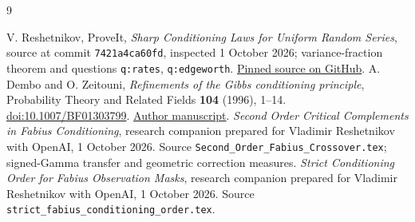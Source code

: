 \documentclass[11pt,a4paper]{article}
\theoremstyle{remark}\newtheorem*{ednote}{Editorial note (ProveIt, 2026-10-01)}
\begin{document}
\begin{thebibliography}{9}\small\raggedright
\setlength{\itemsep}{3pt}\setlength{\parskip}{0pt}
 V. Reshetnikov, ProveIt, \emph{Sharp Conditioning Laws for Uniform Random Series}, source at commit \texttt{7421a4ca60fd}, inspected 1 October 2026; variance-fraction theorem and questions \texttt{q:rates}, \texttt{q:edgeworth}. \href{https://github.com/VladimirReshetnikov/ProveIt/blob/7421a4ca60fdf125411edf412f825aac54278b37/Analysis/FabiusFunction/docs/semi-formalized-research-frontiers/drafts/representations/Sharp_Conditioning_Laws_Uniform_Random_Series/article.tex}{Pinned source on GitHub}.
 A. Dembo and O. Zeitouni, \emph{Refinements of the Gibbs conditioning principle}, Probability Theory and Related Fields \textbf{104} (1996), 1--14. \href{https://doi.org/10.1007/BF01303799}{doi:10.1007/BF01303799}. \href{https://www.wisdom.weizmann.ac.il/~zeitouni/pdf/sanovreffull.pdf}{Author manuscript}.
 \emph{Second Order Critical Complements in Fabius Conditioning}, research companion prepared for Vladimir Reshetnikov with OpenAI, 1 October 2026. Source \texttt{Second\_Order\_Fabius\_Crossover.tex}; signed-Gamma transfer and geometric correction measures.
 \emph{Strict Conditioning Order for Fabius Observation Masks}, research companion prepared for Vladimir Reshetnikov with OpenAI, 1 October 2026. Source \texttt{strict\_fabius\_conditioning\_order.tex}.
\end{thebibliography}
\end{document}
